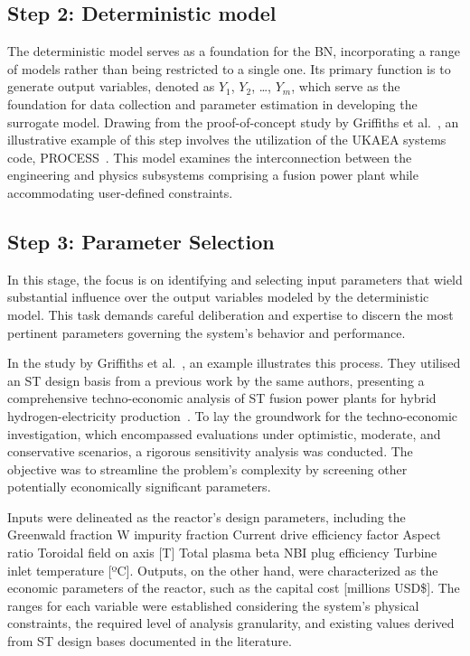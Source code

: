 \documentclass[journal]{IEEEtran}
\begin{document}
\subsection{\textbf{Step 2}: Deterministic model}\label{sec:deterministic}
The deterministic model serves as a foundation for the BN, incorporating a range of models rather than being restricted to a single one. Its primary function is to generate output variables, denoted as $Y_1$, $Y_2$, \ldots, $Y_m$, which serve as the foundation for data collection and parameter estimation in developing the surrogate model. Drawing from the proof-of-concept study by Griffiths et al.~\cite{Griffiths2024}, an illustrative example of this step involves the utilization of the UKAEA systems code, PROCESS~\cite{Kovari2014, Kovari2016}. This model examines the interconnection between the engineering and physics subsystems comprising a fusion power plant while accommodating user-defined constraints.

\subsection{\textbf{Step 3}: Parameter Selection}\label{sec:parameters} 
In this stage, the focus is on identifying and selecting input parameters that wield substantial influence over the output variables modeled by the deterministic model. This task demands careful deliberation and expertise to discern the most pertinent parameters governing the system's behavior and performance.

In the study by Griffiths et al.~\cite{Griffiths2024}, an example illustrates this process. They utilised an ST design basis from a previous work by the same authors, presenting a comprehensive techno-economic analysis of ST fusion power plants for hybrid hydrogen-electricity production~\cite{Hidalgo-Salaverri2023}. To lay the groundwork for the techno-economic investigation, which encompassed evaluations under optimistic, moderate, and conservative scenarios, a rigorous sensitivity analysis was conducted. The objective was to streamline the problem's complexity by screening other potentially economically significant parameters.

Inputs were delineated as the reactor's design parameters, including the Greenwald fraction W impurity fraction Current drive efficiency factor Aspect ratio Toroidal field on axis [T]
Total plasma beta NBI plug efficiency Turbine inlet temperature [ºC]. Outputs, on the other hand, were characterized as the economic parameters of the reactor, such as the capital cost [millions USD\$]. The ranges for each variable were established considering the system's physical constraints, the required level of analysis granularity, and existing values derived from ST design bases documented in the literature.
\end{document}
